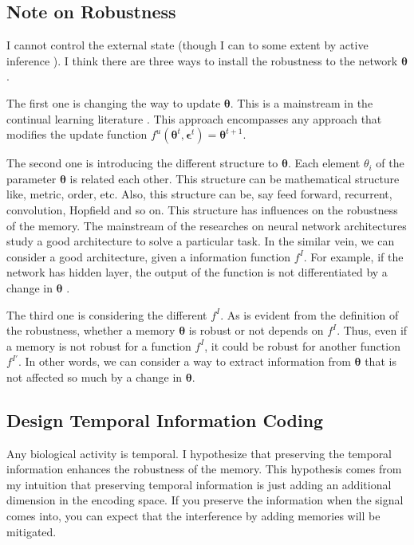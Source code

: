 \documentclass[12pt]{article}
\begin{document}
 \subsection{Note on Robustness}
 I cannot control the external state (though I can to some extent by active inference \cite{Friston10}). 
 I think there are three ways to install the robustness to the network $\bm{\theta}$. 
 
 The first one is changing the way to update $\bm{\theta}$. This is a mainstream in the continual learning literature \cite{Kirkpatrick17,Shin17}. 
 This approach encompasses any approach that modifies the update function $f^u(\bm{\theta}^t, \bm{\epsilon}^t) = \bm{\theta}^{t + 1}$.

 The second one is introducing the different structure to $\bm{\theta}$. Each element $\theta_i$ of the parameter $\bm{\theta}$ is related each other. 
 This structure can  be mathematical structure like, metric, order, etc. Also, this structure can be, say 
 feed forward, recurrent, convolution, Hopfield and so on. This structure has influences on the robustness of 
 the memory. The mainstream of the researches on neural network architectures study a good architecture to solve 
 a particular task. In the similar vein, we can consider a good architecture, given a information function $f^I$. 
 For example, if the network has hidden layer, the output of the function is not differentiated by a change in $\bm{\theta}$ \cite{Watanabe09,Amari06}.

 The third one is considering the different $f^I$. As is evident from the definition of the robustness, whether a memory $\bm{\theta}$ 
 is robust or not depends on $f^I$. Thus, even if a memory is not robust for a function $f^I$, it could be robust for another 
 function $f^{I'}$. In other words, we can consider a way to extract information from $\bm{\theta}$ that is not affected so much by 
 a change in $\bm{\theta}$.

 \subsection{Design Temporal Information Coding}
 Any biological activity is temporal. I hypothesize that preserving the temporal information enhances the robustness 
 of the memory. This hypothesis comes from my intuition that preserving temporal information is just adding an additional 
 dimension in the encoding space. If you preserve the information when the signal comes into, you can expect 
 that the interference by adding memories will be mitigated. 
\end{document}

